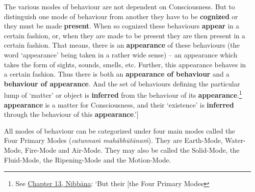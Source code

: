 The various modes of behaviour are not dependent on Consciousness. But to distinguish one mode of behaviour from another they have to be \textbf{cognized} or they must be made \textbf{present}. When so cognized these behaviours \textbf{appear} in a certain fashion, or, when they are made to be present they are then present in a certain fashion. That means, there is an \textbf{appearance} of these behaviours (the word `appearance' being taken in a rather wide sense) -- an appearance which takes the form of sights, sounds, smells, etc. Further, this appearance behaves in a certain fashion. Thus there is both an \textbf{appearance of behaviour} and a \textbf{behaviour of appearance}. And the set of behaviours defining the particular lump of `matter' or object is \textbf{inferred} from the behaviour of its \textbf{appearance}.\footnote{See \href{ch-13-nibbana.xml\#the-four-primary}{Chapter 13, Nibbāna}: `But their {[}the Four Primary Modes} \textbf{appearance} is a matter for Consciousness, and their `existence' is \textbf{inferred} through the behaviour of this \textbf{appearance}.'{]}

All modes of behaviour can be categorized under four main modes called the Four Primary Modes (\emph{catunnaṁ mahābhūtānaṁ}). They are Earth-Mode, Water-Mode, Fire-Mode and Air-Mode. They may also be called the Solid-Mode, the Fluid-Mode, the Ripening-Mode and the Motion-Mode.

